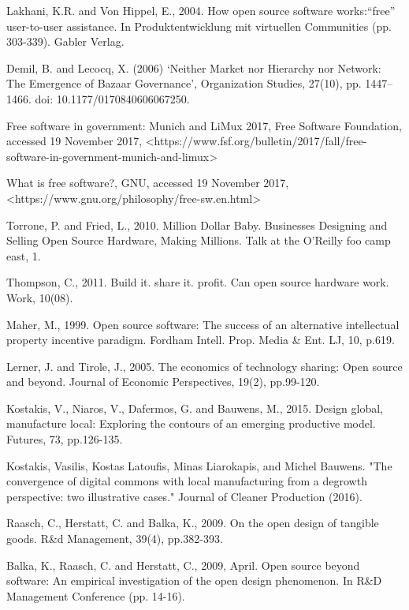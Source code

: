 Lakhani, K.R. and Von Hippel, E., 2004. How open source software works:“free” user-to-user assistance. In Produktentwicklung mit virtuellen Communities (pp. 303-339). Gabler Verlag.

  Demil, B. and Lecocq, X. (2006) ‘Neither Market nor Hierarchy nor Network: The Emergence of Bazaar Governance’, Organization Studies, 27(10), pp. 1447–1466. doi: 10.1177/0170840606067250.

 Free software in government: Munich and LiMux 2017, Free Software Foundation, accessed 19 November 2017, <https://www.fsf.org/bulletin/2017/fall/free-software-in-government-munich-and-limux>

 What is free software?, GNU, accessed 19 November 2017,
<https://www.gnu.org/philosophy/free-sw.en.html>

Torrone, P. and Fried, L., 2010. Million Dollar Baby. Businesses Designing and Selling Open Source Hardware, Making Millions. Talk at the O'Reilly foo camp east, 1.


Thompson, C., 2011. Build it. share it. profit. Can open source hardware work. Work, 10(08).

Maher, M., 1999. Open source software: The success of an alternative intellectual property incentive paradigm. Fordham Intell. Prop. Media & Ent. LJ, 10, p.619.

Lerner, J. and Tirole, J., 2005. The economics of technology sharing: Open source and beyond. Journal of Economic Perspectives, 19(2), pp.99-120.

Kostakis, V., Niaros, V., Dafermos, G. and Bauwens, M., 2015. Design global, manufacture local: Exploring the contours of an emerging productive model. Futures, 73, pp.126-135.

Kostakis, Vasilis, Kostas Latoufis, Minas Liarokapis, and Michel Bauwens. "The convergence of digital commons with local manufacturing from a degrowth perspective: two illustrative cases." Journal of Cleaner Production (2016).

Raasch, C., Herstatt, C. and Balka, K., 2009. On the open design of tangible goods. R&d Management, 39(4), pp.382-393.

Balka, K., Raasch, C. and Herstatt, C., 2009, April. Open source beyond software: An empirical investigation of the open design phenomenon. In R&D Management Conference (pp. 14-16).


